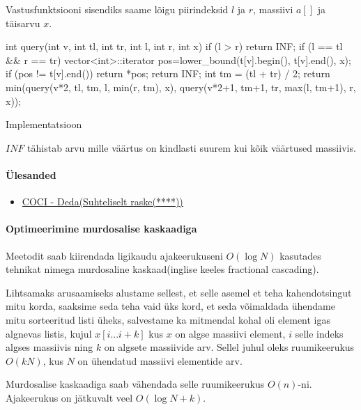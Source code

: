 \documentclass{trkut}
\theoremstyle{definition}
\begin{document}
Vastusfunktsiooni sisendiks saame lõigu piirindeksid $l$ ja $r$, massiivi $a[]$ ja täisarvu $x$.
\begin{cclol}
int query(int v, int tl, int tr, int l, int r, int x) {
if (l > r)
    return INF;
if (l == tl && r == tr) {
    vector<int>::iterator pos=lower_bound(t[v].begin(), t[v].end(), x);
    if (pos != t[v].end())
        return *pos;
    return INF;
}
int tm = (tl + tr) / 2;
return min(query(v*2, tl, tm, l, min(r, tm), x), 
            query(v*2+1, tm+1, tr, max(l, tm+1), r, x));
}
\end{cclol}
 \begin{kk}[H]%
    \caption{Implementatsioon}%
    \label{EMaxx}%
    \end{kk}
$INF$ tähistab arvu mille väärtus on kindlasti suurem kui kõik väärtused massiivis.

\paragraph{Ülesanded}
\begin{itemize}
    \item \href{https://oj.uz/problem/view/COCI17_deda}{COCI - Deda(Suhteliselt raske(****))}
\end{itemize}

\paragraph{Optimeerimine murdosalise kaskaadiga}

Meetodit saab kiirendada ligikaudu ajakeerukuseni $O(\log N)$ kasutades tehnikat nimega murdosaline kaskaad(inglise keeles fractional cascading).

Lihtsamaks arusaamiseks alustame sellest, et selle asemel et teha kahendotsingut mitu korda, saaksime seda teha vaid üks kord, et seda võimaldada ühendame mitu sorteeritud listi üheks, salvestame ka mitmendal kohal oli element igas algnevas listis, kujul $x[i...i+k]$ kus $x$ on algse massiivi element, $i$ selle indeks algses massiivis ning $k$ on algsete massiivide arv. Sellel juhul oleks ruumikeerukus $O(kN)$, kus $N$ on ühendatud massiivi elementide arv. \parencite{EMaxx}

Murdosalise kaskaadiga saab vähendada selle ruumikeerukus $O(n)$-ni. Ajakeerukus on jätkuvalt veel $O(\log N+k)$. \parencite{cascade}
\end{document}
